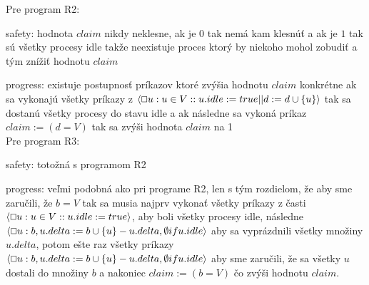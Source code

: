 \documentclass[a4paper]{article}
\begin{document}
Pre program R2:

safety: hodnota $claim$ nikdy neklesne, ak je $0$ tak nemá kam klesnúť a ak je $1$ tak sú všetky procesy idle takže neexistuje proces ktorý by niekoho mohol zobudiť a tým znížiť hodnotu $claim$

progress: existuje postupnosť príkazov ktoré zvýšia hodnotu $claim$ konkrétne ak sa vykonajú všetky príkazy z $\langle \oblong u: u \in V :: u.idle := true || d := d \cup \{ u \} \rangle$ tak sa dostanú všetky procesy do stavu idle a ak následne sa vykoná príkaz $claim :=(d=V)$ tak sa zvýši hodnota $claim$ na 1
\\

Pre program R3:

safety: totožná s programom R2

progress: veľmi podobná ako pri programe R2, len s tým rozdielom, že aby sme zaručili, že $b=V$ tak sa musia najprv vykonať všetky príkazy z časti
$\langle \oblong u: u \in V :: u.idle := true \rangle$, aby boli všetky procesy idle, následne $\langle \oblong u: b,u.delta := b \cup \{ u \} - u.delta, \emptyset if u.idle \rangle$ aby sa vyprázdnili všetky množiny $u.delta$, potom ešte raz všetky príkazy $\langle \oblong u: b,u.delta := b \cup \{ u \} - u.delta, \emptyset if u.idle \rangle$ aby sme zaručili, že sa všetky $u$ dostali do množiny $b$ a nakoniec $claim := (b=V)$ čo zvýši hodnotu $claim$.
\end{document}
